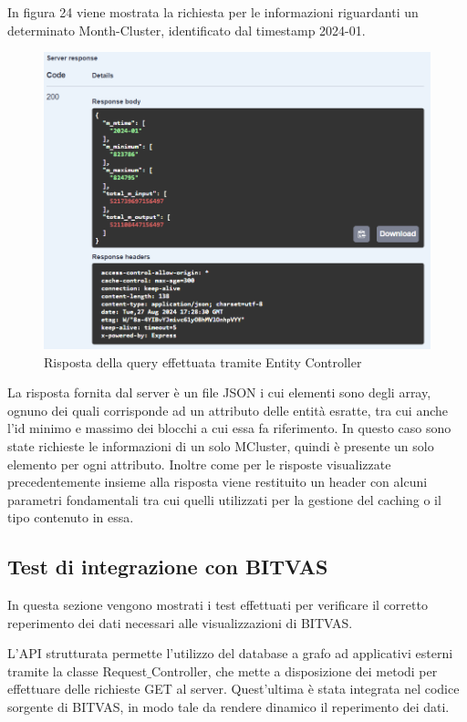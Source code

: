 In figura 24 viene mostrata la richiesta per le informazioni riguardanti un determinato Month-Cluster, identificato dal timestamp 2024-01.
\begin{figure}[H]
    \centering \includegraphics[keepaspectratio=true,scale=0.6]{Images/responseEntityController.png}
    \caption{Risposta della query effettuata tramite Entity Controller}
\end{figure}

La risposta fornita dal server è un file JSON i cui elementi sono degli array, ognuno dei quali corrisponde ad un attributo delle entità esratte, tra cui anche l'id minimo e massimo dei blocchi a cui essa fa riferimento.
In questo caso sono state richieste le informazioni di un solo MCluster, quindi è presente un solo elemento per ogni attributo.
\thispagestyle{mystyle}
Inoltre come per le risposte visualizzate precedentemente insieme alla risposta viene restituito un header con alcuni parametri fondamentali tra cui quelli utilizzati per la gestione del caching o il tipo contenuto in essa.

\subsection{Test di integrazione con BITVAS}
In questa sezione vengono mostrati i test effettuati per verificare il corretto reperimento dei dati necessari alle visualizzazioni di BITVAS.

L'API strutturata permette l'utilizzo del database a grafo ad applicativi esterni tramite la classe Request$\_$Controller, che mette a disposizione dei metodi per effettuare delle richieste GET al server.
Quest'ultima è stata integrata nel codice sorgente di BITVAS, in modo tale da rendere dinamico il reperimento dei dati.


